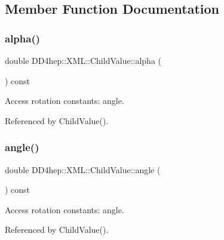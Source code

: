 \subsection{Member Function Documentation}
\hypertarget{struct_d_d4hep_1_1_x_m_l_1_1_child_value_aaeba5280b063dfba0009b5aa1ea89767}{}\label{struct_d_d4hep_1_1_x_m_l_1_1_child_value_aaeba5280b063dfba0009b5aa1ea89767} 
\subsubsection{\texorpdfstring{alpha()}{alpha()}}
{\footnotesize\ttfamily double D\+D4hep\+::\+X\+M\+L\+::\+Child\+Value\+::alpha (\begin{DoxyParamCaption}{ }\end{DoxyParamCaption}) const}



Access rotation constants\+: angle. 



Referenced by Child\+Value().

\hypertarget{struct_d_d4hep_1_1_x_m_l_1_1_child_value_a58e290483e9237ab5c5e40e2d1ea7321}{}\label{struct_d_d4hep_1_1_x_m_l_1_1_child_value_a58e290483e9237ab5c5e40e2d1ea7321} 
\subsubsection{\texorpdfstring{angle()}{angle()}}
{\footnotesize\ttfamily double D\+D4hep\+::\+X\+M\+L\+::\+Child\+Value\+::angle (\begin{DoxyParamCaption}{ }\end{DoxyParamCaption}) const}



Access rotation constants\+: angle. 



Referenced by Child\+Value().

\hypertarget{struct_d_d4hep_1_1_x_m_l_1_1_child_value_ac0534f80c009548cbba3679c21d8a76d}{}\label{struct_d_d4hep_1_1_x_m_l_1_1_child_value_ac0534f80c009548cbba3679c21d8a76d} 
